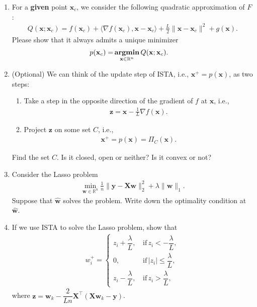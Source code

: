 \documentclass[11pt,letter,notitlepage]{article}
\DeclareMathOperator*{\argmin}{\bf argmin}
\begin{document}
\begin{exercise}
\begin{enumerate}[resume]
    \item For a \textbf{given} point $\textbf{x}_c$, we consider the following quadratic approximation of $F$:
    \begin{align*}
       Q(\mathbf{x};\mathbf{x}_c)=f(\mathbf{x}_c)+\langle\nabla f(\mathbf{x}_c),\mathbf{x}-\mathbf{x}_c\rangle+\frac{L}{2}\|\mathbf{x}-\mathbf{x}_c\|^2+g(\mathbf{x}).
    \end{align*}
    Please show that it always admits a unique minimizer
    \begin{align*}
       p(\mathbf{x}_c)=&\argmin_{\textbf{x}\in\mathbb{R}^n}Q(\mathbf{x};\mathbf{x}_c).
    \end{align*}
    
    \item (Optional) We can think of the update step of ISTA, i.e.,  $\textbf{x}^+=p(\textbf{x})$, as two steps:
    \begin{enumerate}
        \item Take a step in the opposite direction of the gradient of $f$ at $\textbf{x}$, i.e., 
        \begin{align*}
             \textbf{z}=\textbf{x}-\frac{1}{L}\nabla f(\textbf{x}).
        \end{align*}
        
        \item Project $\textbf{z}$ on some set $C$, i.e.,
        \begin{align*}
            \textbf{x}^+=p(\textbf{x})=\Pi_C(\textbf{x}).
        \end{align*}
        
    \end{enumerate}
    Find the set $C$. Is it closed, open or neither? Is it convex or not?
    
    \item Consider the Lasso problem
    \begin{align*}
        \min_{\textbf{w}\in\mathbb{R}^n} \frac{1}{n} \|\textbf{y}-\textbf{X}\textbf{w}\|_2^2+\lambda\|\textbf{w}\|_1.
    \end{align*}
    Suppose that $\hat{\textbf{w}}$ solves the problem. Write down the optimality condition at $\hat{\textbf{w}}$.
    
    \item If we use ISTA to solve the Lasso problem, show that
    \begin{align*}
        w_i^+=
        \begin{cases}
            z_i+\dfrac{\lambda}{L},\,&\text{if}\,z_i<-\dfrac{\lambda}{L},\\
            0,\,&\text{if}\,|z_i|\le\dfrac{\lambda}{L},\\
            z_i-\dfrac{\lambda}{L},\,&\text{if}\,z_i>\dfrac{\lambda}{L},
        \end{cases}
    \end{align*}
    where $\textbf{z}=\textbf{w}_k-\dfrac{2}{Ln}\textbf{X}^\top(\textbf{X}\textbf{w}_k-\textbf{y})$.
    

\end{enumerate}
\end{exercise}
\end{document}
